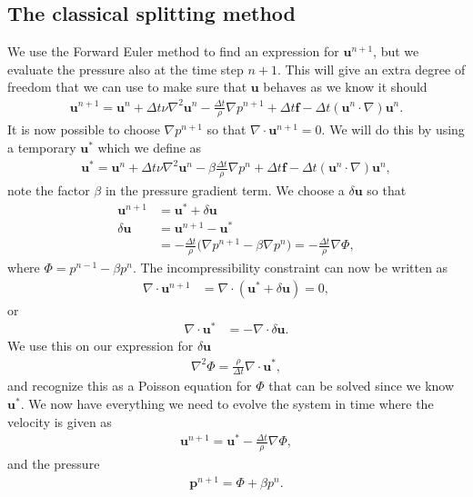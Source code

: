 \documentclass[a4paper,10pt]{article}
\renewcommand{\vec}[1]{\mathbf{#1}}
\renewcommand{\(}{\left(}
\renewcommand{\)}{\right)}
\begin{document}
\subsection{The classical splitting method}
We use the Forward Euler method to find an expression for $\vec u^{n+1}$, but we evaluate the pressure also at the time step $n+1$. This will give an extra degree of freedom that we can use to make sure that $\vec u$ behaves as we know it should
\begin{align*}
  \vec u^{n+1} = \vec u^{n} + \Delta t\nu\nabla^2\vec u^n - \frac{\Delta t}{\rho}\nabla p^{n+1} + \Delta t\vec f - \Delta t(\vec u^n\cdot \nabla)\vec u^n.
\end{align*}
It is now possible to choose $\nabla p^{n+1}$ so that $\nabla \cdot \vec u^{n+1} = 0$. We will do this by using a temporary $\vec u^*$ which we define as
\begin{align}
  \label{eq:ustar}
  \vec u^* = \vec u^{n} + \Delta t\nu\nabla^2\vec u^n - \beta\frac{\Delta t}{\rho}\nabla p^n + \Delta t\vec f - \Delta t(\vec u^n\cdot \nabla)\vec u^n,
\end{align}
note the factor $\beta$ in the pressure gradient term. We choose a $\delta \vec u$ so that
\begin{align*}
  \vec u^{n+1} &= \vec u^* + \delta \vec u\\
  \delta \vec u &= \vec u^{n+1} - \vec u^*\\
  &= -\frac{\Delta t}{\rho}\Big(\nabla p^{n+1} - \beta\nabla p^n\Big) = -\frac{\Delta t}{\rho}\nabla \Phi,
\end{align*}
where $\Phi = p^{n-1} - \beta p^n$. The incompressibility constraint can now be written as
\begin{align*}
  \nabla \cdot \vec u^{n+1} &= \nabla\cdot(\vec u^* + \delta \vec u) = 0,
\end{align*}
or
\begin{align*}
  \nabla \cdot \vec u^* &= -\nabla \cdot\delta \vec u.
\end{align*}
We use this on our expression for $\delta \vec u$
\begin{align*}
  \nabla^2 \Phi = \frac{\rho}{\Delta t}\nabla \cdot \vec u^*,
\end{align*}
and recognize this as a Poisson equation for $\Phi$ that can be solved since we know $\vec u^*$. We now have everything we need to evolve the system in time where the velocity is given as
\begin{align}
  \label{eq:u_next}
  \vec u^{n+1} = \vec u^* - \frac{\Delta t}{\rho}\nabla \Phi,
\end{align}
and the pressure
\begin{align}
  \label{eq:p_next}
  \vec p^{n+1} = \Phi + \beta p^n.
\end{align}
\end{document}

